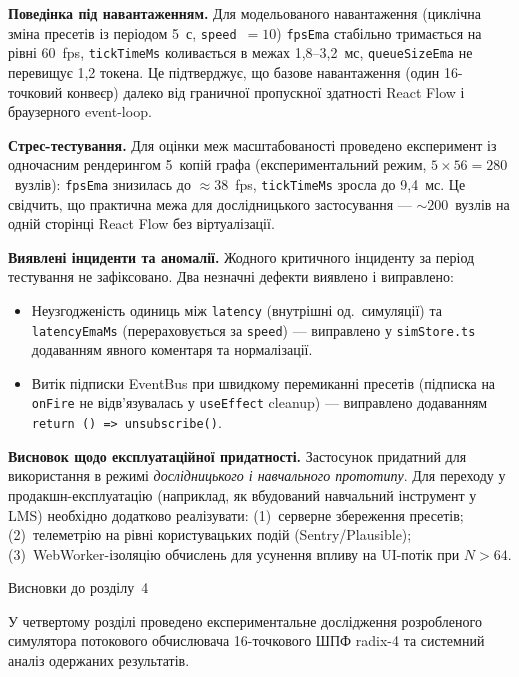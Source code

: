 \textbf{Поведінка під навантаженням.} Для модельованого навантаження
(циклічна зміна пресетів із періодом 5~с, \texttt{speed}~\(= 10\))
\texttt{fpsEma} стабільно тримається на рівні 60~fps,
\texttt{tickTimeMs} коливається в межах 1,8--3,2~мс,
\texttt{queueSizeEma} не перевищує 1,2 токена. Це підтверджує, що базове
навантаження (один 16-точковий конвеєр) далеко від граничної пропускної
здатності React Flow і браузерного event-loop.

\textbf{Стрес-тестування.} Для оцінки меж масштабованості проведено
експеримент із одночасним рендерингом 5~копій графа (експериментальний
режим, \(5 \times 56 = 280\)~вузлів): \texttt{fpsEma} знизилась до
\(\approx 38\)~fps, \texttt{tickTimeMs} зросла до 9,4~мс. Це свідчить,
що практична межа для дослідницького застосування ---
\(\sim 200\)~вузлів на одній сторінці React Flow без віртуалізації.

\textbf{Виявлені інциденти та аномалії.} Жодного критичного інциденту за
період тестування не зафіксовано. Два незначні дефекти виявлено і
виправлено:

\begin{itemize}
\item
  Неузгодженість одиниць між \texttt{latency} (внутрішні од.~симуляції)
  та \texttt{latencyEmaMs} (перераховується за \texttt{speed}) ---
  виправлено у \texttt{simStore.ts} додаванням явного коментаря та
  нормалізації.
\item
  Витік підписки EventBus при швидкому перемиканні пресетів (підписка на
  \texttt{onFire} не відв'язувалась у \texttt{useEffect} cleanup) ---
  виправлено додаванням
  \texttt{return\ ()\ =\textgreater{}\ unsubscribe()}.
\end{itemize}

\textbf{Висновок щодо експлуатаційної придатності.} Застосунок придатний
для використання в режимі \emph{дослідницького і навчального прототипу}.
Для переходу у продакшн-експлуатацію (наприклад, як вбудований
навчальний інструмент у LMS) необхідно додатково реалізувати:
(1)~серверне збереження пресетів; (2)~телеметрію на рівні користувацьких
подій (Sentry/Plausible); (3)~WebWorker-ізоляцію обчислень для усунення
впливу на UI-потік при \(N > 64\).

\protect{}\label{_Toc229681188}{}Висновки до розділу~4

У четвертому розділі проведено експериментальне дослідження розробленого
симулятора потокового обчислювача 16-точкового ШПФ radix-4 та системний
аналіз одержаних результатів.

